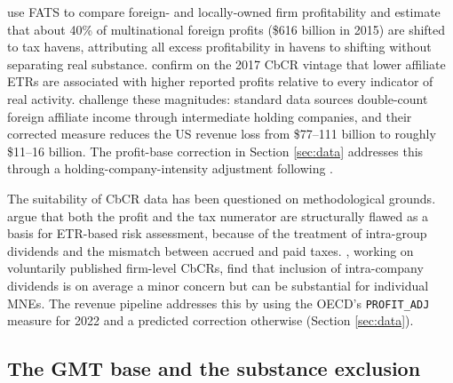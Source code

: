 \documentclass[11pt,a4paper]{article}
\newcommand{\code}[1]{\texttt{#1}}
\begin{document}
\citet{torslov2023} use FATS to compare foreign- and locally-owned firm profitability and estimate that about 40\% of multinational foreign profits (\$616 billion in 2015) are shifted to tax havens, attributing all excess profitability in havens to shifting without separating real substance. \citet{garcia-bernardo2021} confirm on the 2017 CbCR vintage that lower affiliate ETRs are associated with higher reported profits relative to every indicator of real activity. \citet{blouin2023} challenge these magnitudes: standard data sources double-count foreign affiliate income through intermediate holding companies, and their corrected measure reduces the \citet{clausing2016} US revenue loss from \$77--111 billion to roughly \$11--16 billion. The profit-base correction in Section \ref{sec:data} addresses this through a holding-company-intensity adjustment following \citet{garcia-bernardo2022a}.

The suitability of CbCR data has been questioned on methodological grounds. \citet{bobeldijk2019} argue that both the profit and the tax numerator are structurally flawed as a basis for ETR-based risk assessment, because of the treatment of intra-group dividends and the mismatch between accrued and paid taxes. \citet{godar2024}, working on voluntarily published firm-level CbCRs, find that inclusion of intra-company dividends is on average a minor concern but can be substantial for individual MNEs. The revenue pipeline addresses this by using the OECD's \code{PROFIT\_ADJ} measure for 2022 and a predicted correction otherwise (Section \ref{sec:data}).

\subsection{The GMT base and the substance exclusion}
\end{document}
